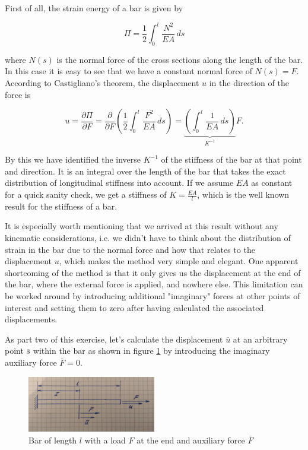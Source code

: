 First of all, the strain energy of a bar is given by

\begin{equation}
\Pi = \frac{1}{2}\int_{0}^{l}\frac{N^2}{EA}\,ds
\end{equation}

where $N(s)$ is the normal force of the cross sections along the length of the bar.
In this case it is easy to see that we have a constant normal force of $N(s) = F$.
According to Castigliano's theorem, the displacement $u$ in the direction of the force is

\begin{equation}
u = \frac{\partial \Pi}{\partial F} = \frac{\partial}{\partial F}\left(\frac{1}{2}\int_{0}^{l}\frac{F^2}{EA}\,ds\right) = \underbrace{\left(\int_{0}^{l}\frac{1}{EA}\,ds\right)}_{K^{-1}}F.
\end{equation}

By this we have identified the inverse $K^{-1}$ of the stiffness of the bar at that point and direction.
It is an integral over the length of the bar that takes the exact distribution of longitudinal stiffness into account.
If we assume $EA$ as constant for a quick sanity check, we get a stiffness of $K = \frac{EA}{l}$, which is the well known result for the stiffness of a bar.

It is especially worth mentioning that we arrived at this result without any kinematic considerations, i.e. we didn't have to think about the distribution of strain in the bar due to the normal force and how that relates to the displacement $u$, which makes the method very simple and elegant.
One apparent shortcoming of the method is that it only gives us the displacement at the end of the bar, where the external force is applied, and nowhere else.
This limitation can be worked around by introducing additional "imaginary" forces at other points of interest and setting them to zero after having calculated the associated displacements.

As part two of this exercise, let's calculate the displacement $\overline{u}$ at an arbitrary point $\overline{s}$ within the bar as shown in figure \ref{fig:castigliano-bar-2} by introducing the imaginary auxiliary force $\overline{F} = 0$.

\begin{figure}[h]
\centering
\includegraphics[width=0.5\textwidth]{figures/elements/castigliano-bar-2.jpg}
\caption{Bar of length $l$ with a load $F$ at the end and auxiliary force $\overline{F}$}
\label{fig:castigliano-bar-2}
\end{figure}

